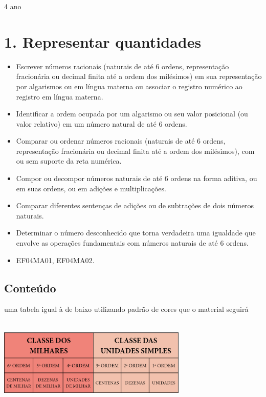 \protect\hypertarget{_Hlk129432535}{}{}4 ano

\section{1. Representar quantidades}\label{muxf3dulo-1}


\begin{itemize}
\item Escrever números racionais (naturais de até 6 ordens, representação
fracionária ou decimal finita até a ordem dos milésimos) em sua
representação por algarismos ou em língua materna ou associar o registro
numérico ao registro em língua materna.
\item Identificar a ordem ocupada por um algarismo ou seu valor posicional
(ou valor relativo) em um número natural de até 6 ordens.
\item Comparar ou ordenar números racionais (naturais de até 6 ordens,
representação fracionária ou decimal finita até a ordem dos milésimos),
com ou sem suporte da reta numérica.
\item Compor ou decompor números naturais de até 6 ordens na forma aditiva,
ou em suas ordens, ou em adições e multiplicações.
\item Comparar diferentes sentenças de adições ou de subtrações de dois
números naturais.
\item Determinar o número desconhecido que torna verdadeira uma igualdade
que envolve as operações fundamentais com números naturais de até 6
ordens.
\end{itemize}


\begin{itemize}
\item EF04MA01, EF04MA02.
\end{itemize}

\subsection{Conteúdo}\label{conteuxfado}
\Produzir uma tabela igual à de baixo utilizando padrão de cores que o material seguirá

\includegraphics[width=3.55128in,height=1.66618in]{media/image1.png}

